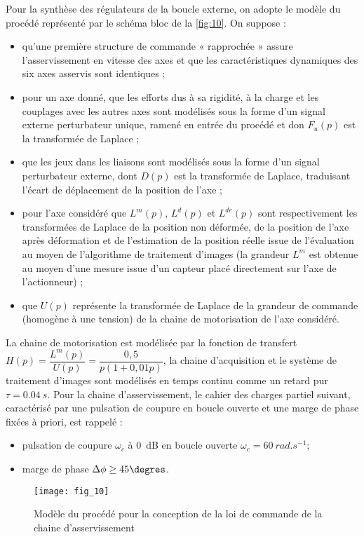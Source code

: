 Pour la synthèse des régulateurs de la boucle externe, on adopte le modèle du procédé représenté par le schéma
bloc de la \autoref{fig:10}. On suppose :
\begin{itemize}
\item qu’une première structure de commande « rapprochée » assure l’asservissement en vitesse des axes et que
les caractéristiques dynamiques des six axes asservis sont identiques ;
\item pour un axe donné, que les efforts dus à sa rigidité, à la charge et les couplages avec les autres axes sont
modélisés sous la forme d’un signal externe perturbateur unique, ramené en entrée du procédé et don $F_u(p)$
est la transformée de Laplace ;
\item que les jeux dans les liaisons sont modélisés sous la forme d’un signal perturbateur externe, dont $D(p)$ est
la transformée de Laplace, traduisant l’écart de déplacement de la position de l’axe ;
\item pour l’axe considéré que $L^m(p)$, $L^d(p)$ et $L^{de}(p)$ sont respectivement les transformées de Laplace de la
position non déformée, de la position de l’axe après déformation et de l’estimation de la position réelle issue
de l’évaluation au moyen de l’algorithme de traitement d’images (la grandeur $L^m$  est obtenue au moyen
d’une mesure issue d’un capteur placé directement sur l’axe de l’actionneur) ;
\item que $U(p)$ représente la transformée de Laplace de la grandeur de commande (homogène à une tension) de
la chaine de motorisation de l’axe considéré.
\end{itemize}
La chaine de motorisation est modélisée par la fonction de transfert $H(p) = \dfrac{L^m(p)}{U(p)} = \dfrac{0,5}{p\left(1+0,01 p\right)}$, la chaine
d’acquisition et le système de traitement d’images sont modélisés en temps continu comme un retard pur $\tau =\SI{0,04}{s}$. Pour la chaine d’asservissement, le cahier des charges partiel suivant, caractérisé par une pulsation
de coupure en boucle ouverte et une marge de phase fixées à priori, est rappelé :
\begin{itemize}
\item pulsation de coupure $\omega_c$ à \SI{0}{dB} en boucle ouverte $\omega_c = \SI{60}{rad.s^{-1}}$;
\item marge de phase $\Delta \phi \geq 45 \degres$.
\end{itemize}

\begin{figure}[H]
\centering
\texttt{[image: fig\_10]}
\caption{\label{fig:10}  Modèle du procédé pour la conception de la loi de commande de la chaine d’asservissement}
\end{figure}


